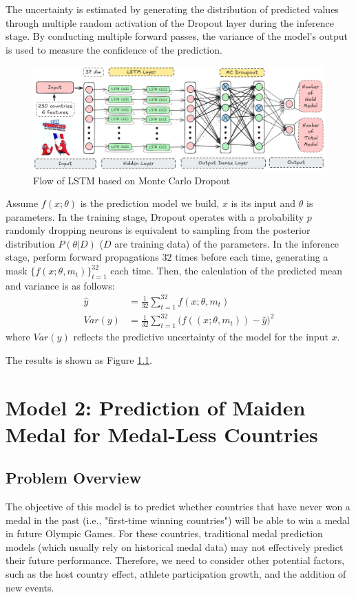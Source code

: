 \documentclass{mcmthesis}
\begin{document}
The uncertainty is estimated by generating the distribution of predicted values through multiple random activation of the Dropout layer during the inference stage. By conducting multiple forward passes, the variance of the model's output is used to measure the confidence of the prediction.

\begin{figure}
	\centering
	\includegraphics[width=1\linewidth]{fig/LSTM-MCD}
	\caption{Flow of LSTM based on Monte Carlo Dropout}
	\label{fig:lstm-mcd}
\end{figure}


Assume $f(x;\theta)$ is the prediction model we build, $x$ is its input and $\theta$ is parameters. In the training stage, Dropout operates with a probability $p$
randomly dropping neurons is equivalent to sampling from the posterior distribution $P(\theta|D)$ ($D$ are training data) of the parameters. In the inference stage, perform forward propagations $32$ times before each time, generating a mask $\{f(x;\theta,m_t)\}_{t=1}^{32}$ each time. Then, the calculation of the predicted mean and variance is as follows:
\begin{align*}
\hat{y}&=\frac{1}{32} \sum_{t=1}^{32} f(x;\theta,m_t) \\
Var(y) &=\frac{1}{32} \sum_{t=1}^{32} \big( f((x;\theta,m_t)) - \hat{y} \big)^2
\end{align*}
where $Var(y)$ reflects the predictive uncertainty of the model for the input $x$.

The results is shown as Figure \ref{}.











\section{Model 2: Prediction of Maiden Medal for Medal-Less Countries}


\subsection{Problem Overview}
The objective of this model is to predict whether countries that have never won a medal in the past (i.e., "first-time winning countries") will be able to win a medal in future Olympic Games. For these countries, traditional medal prediction models (which usually rely on historical medal data) may not effectively predict their future performance. Therefore, we need to consider other potential factors, such as the host country effect, athlete participation growth, and the addition of new events.
\end{document}
